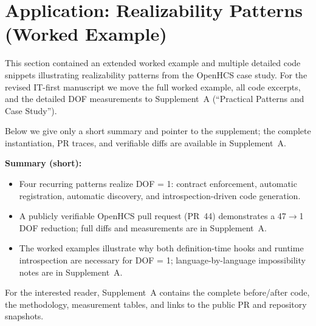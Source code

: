 \section{Application: Realizability Patterns (Worked Example)}\label{sec:empirical}

This section contained an extended worked example and multiple detailed code snippets illustrating realizability patterns from the OpenHCS case study. For the revised IT-first manuscript we move the full worked example, all code excerpts, and the detailed DOF measurements to Supplement~A (``Practical Patterns and Case Study'').

Below we give only a short summary and pointer to the supplement; the complete instantiation, PR traces, and verifiable diffs are available in Supplement~A.

\textbf{Summary (short):}
\begin{itemize}
\item Four recurring patterns realize DOF = 1: contract enforcement, automatic registration, automatic discovery, and introspection-driven code generation.
\item A publicly verifiable OpenHCS pull request (PR~44) demonstrates a 47$\to$1 DOF reduction; full diffs and measurements are in Supplement~A.
\item The worked examples illustrate why both definition-time hooks and runtime introspection are necessary for DOF = 1; language-by-language impossibility notes are in Supplement~A.
\end{itemize}

For the interested reader, Supplement~A contains the complete before/after code, the methodology, measurement tables, and links to the public PR and repository snapshots.

